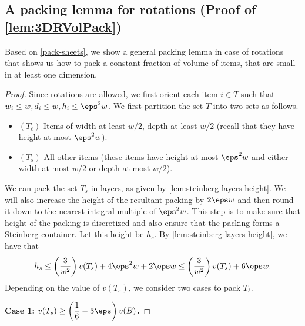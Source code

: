 \subsection{A packing lemma for rotations (Proof of \texorpdfstring{\cref{lem:3DRVolPack}}{Lemma 2.6})}
\label{sec:3dr-vol-pack}
Based on \cref{pack-sheets}, we show a general packing lemma in case of rotations that shows us how to pack a constant fraction
of volume of items, that are small in at least one dimension.

\tDRVolPack*
\begin{proof}
    Since rotations are allowed, we first orient each item $i\in T$ such that $w_i\le w,d_i\le w,h_i\le \eps^2 w$.
We first partition the set $T$ into two sets as follows.
\begin{itemize}
	\item $(T_{\ell})$ Items of width at least $w/2$, depth at least $w/2$ (recall that they have height at most $\eps^2 w$).
	\item {$(T_s)$ All other items (these items have height at most $\eps^2 w$
	and either width at most $w/2$ or depth at most $w/2$).}
\end{itemize}
We can pack the set $T_s$ in layers, as given by \cref{lem:steinberg-layers-height}.
We will also increase the height of the resultant packing by $2\eps w$
and then round it down to the nearest integral multiple of $\eps^2 w$.
This step is to make sure that height of the packing is discretized and also ensure that
the packing forms a Steinberg container.
Let this height be $h_s$. By \cref{lem:steinberg-layers-height}, we have that
\begin{align}
    h_s\le \left(\frac{3}{w^2}\right)v(T_s)+4\eps^2 w+2\eps w\le \left(\frac{3}{w^2}\right)v(T_s)+6\eps w.\label{eq:hs-upper-bound}
\end{align}
Depending on the value of $v(T_s)$, we consider two cases to pack $T_{\ell}$.

\textbf{Case 1: $\displaystyle v(T_s)\ge \left(\frac16-3\eps\right)v(B)$.}


\end{proof}
